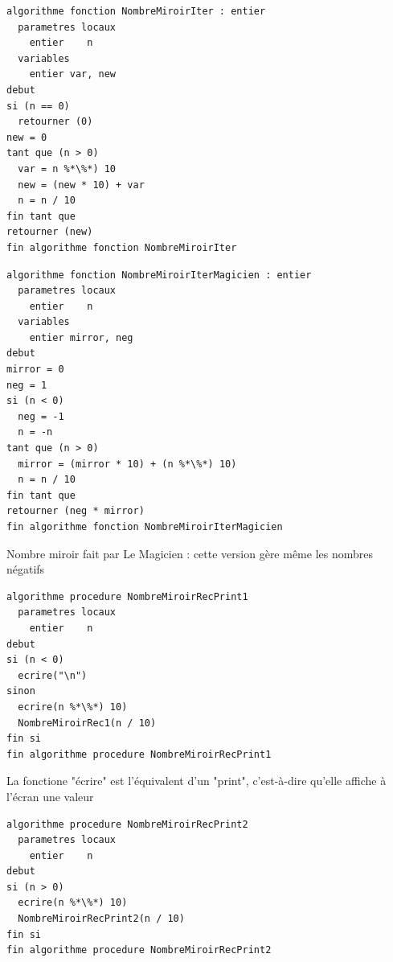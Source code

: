 \documentclass[11pt,a4paper]{article}
\begin{document}
\begin{table}[ht!]
  \centering
\begin{lstlisting}[style=algorithmique]
algorithme fonction NombreMiroirIter : entier
  parametres locaux
    entier    n
  variables
    entier var, new
debut
si (n == 0)
  retourner (0)
new = 0
tant que (n > 0)
  var = n %*\%*) 10
  new = (new * 10) + var
  n = n / 10
fin tant que
retourner (new)
fin algorithme fonction NombreMiroirIter \end{lstlisting}
\end{table}


\begin{table}[ht!]
  \centering
\begin{lstlisting}[style=algorithmique]
algorithme fonction NombreMiroirIterMagicien : entier
  parametres locaux
    entier    n
  variables
    entier mirror, neg
debut
mirror = 0
neg = 1
si (n < 0)
  neg = -1
  n = -n
tant que (n > 0)
  mirror = (mirror * 10) + (n %*\%*) 10)
  n = n / 10
fin tant que
retourner (neg * mirror)
fin algorithme fonction NombreMiroirIterMagicien \end{lstlisting}
  \caption{Nombre miroir fait par Le Magicien : cette version gère même les nombres négatifs}
\end{table}


\bigskip

\newpage


\begin{table}[ht!]
  \centering
\begin{lstlisting}[style=algorithmique]
algorithme procedure NombreMiroirRecPrint1
  parametres locaux
    entier    n
debut
si (n < 0)
  ecrire("\n")
sinon
  ecrire(n %*\%*) 10)
  NombreMiroirRec1(n / 10)
fin si
fin algorithme procedure NombreMiroirRecPrint1 \end{lstlisting}
  \caption{La fonctione "écrire" est l'équivalent d'un "print", c'est-à-dire qu'elle affiche à l'écran une valeur}
\end{table}

\clearpage

\begin{table}[ht!]
  \centering
\begin{lstlisting}[style=algorithmique]
algorithme procedure NombreMiroirRecPrint2
  parametres locaux
    entier    n
debut
si (n > 0)
  ecrire(n %*\%*) 10)
  NombreMiroirRecPrint2(n / 10)
fin si
fin algorithme procedure NombreMiroirRecPrint2 \end{lstlisting}
\end{table}
\end{document}
